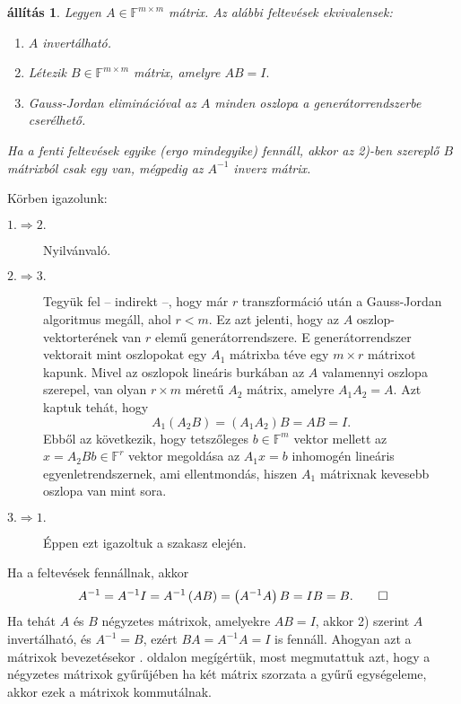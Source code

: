 \documentclass[9pt, a4paper, showtrims]{memoir}
\makeatletter
\renewenvironment{proof}[1][\proofname]
    {\par\pushQED{\qed}%
    \normalfont \topsep6\p@\@plus6\p@\relax
    \trivlist
    \item[\hskip\labelsep
        \itshape
    #1\@addpunct{:}]\ignorespaces}
    {\popQED\endtrivlist\@endpefalse}
\theoremstyle{plain}
\newtheorem{proposition}{állítás}[chapter]
\theoremstyle{remark}
\theoremstyle{definition}
\makeatother
\begin{document}
\begin{proposition}
    Legyen $A\in\mathbb{F}^{m\times m}$ mátrix. Az alábbi feltevések ekvivalensek:
    \begin{enumerate}
        \item
            $A$ invertálható.
        \item 
            Létezik $B\in\mathbb{F}^{m\times m}$ mátrix, amelyre
            \begin{math}
                AB=I.
            \end{math}
        \item 
            Gauss-Jordan eliminációval  az $A$ minden oszlopa a generátorrendszerbe cserélhető.
    \end{enumerate}
    Ha a fenti feltevések egyike (ergo mindegyike) fennáll, 
    akkor az 2)-ben szereplő $B$ mátrixból csak egy van, 
    mégpedig az $A^{-1}$ inverz mátrix.
\end{proposition}
\begin{proof}
    Körben igazolunk:
    \begin{description}
        \item[$1.\Rightarrow 2.$] Nyilvánvaló.
        \item[$2.\Rightarrow 3.$] 
            Tegyük fel -- indirekt --, hogy már $r$ transzformáció után a Gauss-Jordan algoritmus megáll, ahol $r<m$.
            Ez azt jelenti, hogy az $A$ oszlop-vektorterének van $r$ elemű generátorrendszere.
            E generátorrendszer vektorait mint oszlopokat egy $A_1$ mátrixba téve egy $m\times r$ mátrixot kapunk.
            Mivel az oszlopok lineáris burkában az $A$ valamennyi oszlopa szerepel,
            van olyan $r\times m$ méretű $A_2$ mátrix, amelyre 
            \(
            A_1A_2=A.
            \)
            Azt kaptuk tehát, hogy
            \[
                A_1\left( A_2B \right)=\left( A_1A_2 \right)B=AB=I.
            \]
            Ebből az következik,
            hogy tetszőleges $b\in\mathbb{F}^{m}$ vektor mellett az
            \begin{math}
                x=A_2Bb\in\mathbb{F}^{r}
            \end{math}
            vektor megoldása az $A_1x=b$ inhomogén lineáris egyenletrendszernek,
            ami ellentmondás, hiszen $A_1$ mátrixnak kevesebb oszlopa van mint sora.
        \item[$3.\Rightarrow 1.$] Éppen ezt igazoltuk a szakasz elején.
    \end{description}
    Ha a feltevések fennállnak, akkor
    \[
        A^{-1}=A^{-1}I=A^{-1}\left( AB \right)=\left( A^{-1}A \right)B=IB=B.\qedhere
    \]
\end{proof}
Ha tehát $A$ és $B$ négyzetes mátrixok, amelyekre $AB=I$,
akkor 2) szerint $A$ invertálható, és $A^{-1}=B$, ezért 
$BA=A^{-1}A=I$ is fennáll.
Ahogyan azt a mátrixok bevezetésekor . oldalon megígértük,
most megmutattuk azt, hogy a négyzetes mátrixok gyűrűjében ha két mátrix szorzata a gyűrű
egységeleme, akkor ezek a mátrixok kommutálnak.
\end{document}
